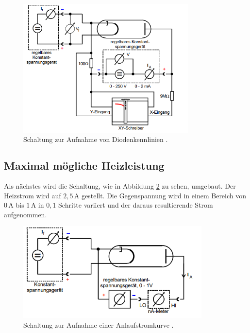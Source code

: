 \begin{figure}[H]
    \centering
    \includegraphics[height=70mm]{bilder/V2.png}
    \caption{Schaltung zur Aufnahme von Diodenkennlinien \cite{a1}. \label{Abbildung4} }
\end{figure}

\subsection{Maximal mögliche Heizleistung}

\begin{flushleft}
    Als nächstes wird die Schaltung, wie in Abbildung \ref{Abbildung5} zu sehen, umgebaut.
    Der Heizstrom wird auf $2,5\,\unit{\ampere}$ gestellt.
    Die Gegenspannung wird in einem Bereich von $0\,\unit{\ampere}$ bis $1\,\unit{\ampere}$ in $0,1$ Schritte variiert und der daraus resultierende Strom aufgenommen. 
\end{flushleft}

\begin{figure}[H]
    \centering
    \includegraphics[height=50mm]{bilder/V3.png}
    \caption{ Schaltung zur Aufnahme einer Anlaufstromkurve \cite{a1}. \label{Abbildung5} }
\end{figure}